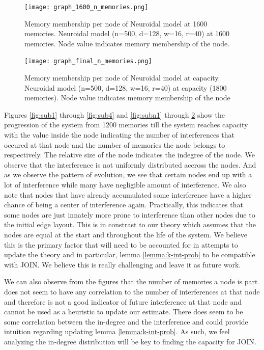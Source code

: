 \begin{figure}%
    \centering
    \texttt{[image: graph\_1600\_n\_memories.png]}
    \caption[Memory membership per node of Neuroidal model at 1600 memories]{Memory membership per node of Neuroidal model at 1600 memories. \textmd{Neuroidal model (n=500, d=128, w=16, r=40) at 1600 memories. Node value indicates memory membership of the node.}}
    \label{fig:subn3}
\end{figure}

\begin{figure}%
    \centering
    \texttt{[image: graph\_final\_n\_memories.png]}
    \caption[Memory membership per node of Neuroidal model at capacity]{Memory membership per node of Neuroidal model at capacity. \textmd{Neuroidal model (n=500, d=128, w=16, r=40) at capacity (1800 memories). Node value indicates memory membership of the node}}
    \label{fig:subn4}
\end{figure}

Figures \ref{fig:sub1} through \ref{fig:sub4} and \ref{fig:subn1} through \ref{fig:subn4} show the progression of the system from 1200 memories till the system reaches capacity with the value inside the node indicating the number of interferences that occured at that node and the number of memories the node belongs to respectively. The relative size of the node indicates the indegree of the node.  We observe that the interference is not uniformly distributed accross the nodes. And as we observe the pattern of evolution, we see that certain nodes end up with a lot of interference while many have negligible amount of interference. We also note that nodes that have already accumulated some interference have a higher chance of being a center of interference again. Practically, this indicates that some nodes are just innately more prone to interference than other nodes due to the initial edge layout. This is in constrast to our theory which assumes that the nodes are equal at the start and throughout the life of the system. We believe this is the primary factor that will need to be accounted for in attempts to update the theory and in particular, lemma \ref{lemma:k-int-prob} to be compatible with JOIN. We believe this is really challenging and leave it as future work. 

We can also observe from the figures that the number of memories a node is part does not seem to have any correlation to the number of interferences at that node and therefore is not a good indicator of future interference at that node and cannot be used as a heuristic to update our estimate. There does seem to be some correlation between the in-degree and the interference and could provide intuition regarding updating lemma \ref{lemma:k-int-prob}. As such, we feel analyzing the in-degree distribution will be key to finding the capacity for JOIN. 












